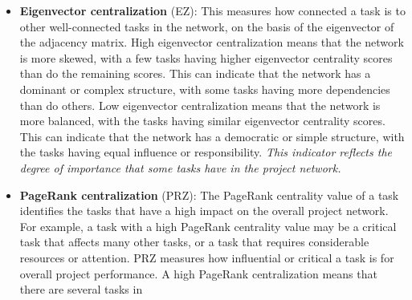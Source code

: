 \documentclass[preprint,
3p]{elsarticle} %
\begin{document}
\begin{appendices}
\begin{itemize}
  with high closeness centralization may be a critical task that affects
  many other tasks or a task that requires considerable resources or
  attention. \emph{CZ reflects the degree of accessibility or
  reachability; the HZ reflects the efficiency or effectiveness of some
  tasks have in the project network.} The similarity between closeness
  centralization and harmonic centralization is that they both use the
  inverse of the distances between tasks to measure their closeness. The
  difference is that closeness centralization uses the arithmetic means
  of the inverse distances, whereas harmonic centralization uses the
  harmonic mean of the inverse distances. The harmonic mean is more
  sensitive to small values than is the arithmetic mean. This fact
  implies that harmonic centralization gives more weight to the tasks
  that are far from others, while closeness centralization gives more
  weight to the tasks that are close to others. Therefore, harmonic
  centralization can be more useful for detecting outliers or isolated
  tasks in the network, whereas closeness centralization can be more
  useful for detecting hubs or central tasks in the network.
\item
  \textbf{Eigenvector centralization} (EZ): This measures how connected
  a task is to other well-connected tasks in the network, on the basis
  of the eigenvector of the adjacency matrix. High eigenvector
  centralization means that the network is more skewed, with a few tasks
  having higher eigenvector centrality scores than do the remaining
  scores. This can indicate that the network has a dominant or complex
  structure, with some tasks having more dependencies than do others.
  Low eigenvector centralization means that the network is more
  balanced, with the tasks having similar eigenvector centrality scores.
  This can indicate that the network has a democratic or simple
  structure, with the tasks having equal influence or responsibility.
  \emph{This indicator reflects the degree of importance that some tasks
  have in the project network.}
\item
  \textbf{PageRank centralization} (PRZ): The PageRank centrality value
  of a task identifies the tasks that have a high impact on the overall
  project network. For example, a task with a high PageRank centrality
  value may be a critical task that affects many other tasks, or a task
  that requires considerable resources or attention. PRZ measures how
  influential or critical a task is for overall project performance. A
  high PageRank centralization means that there are several tasks in

\end{itemize}
\end{appendices}
\end{document}
